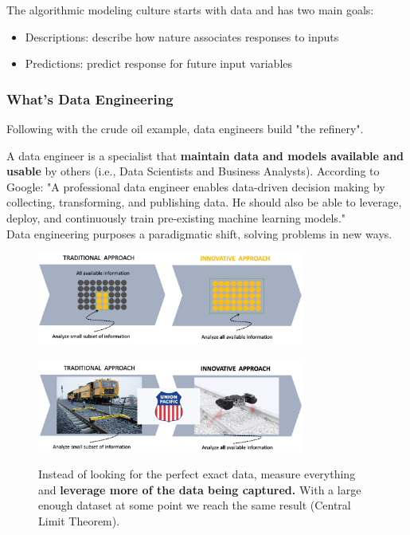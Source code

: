 \documentclass[10pt,a4paper]{article}
\begin{document}
The algorithmic modeling culture starts with data and has two main goals:
\begin{itemize}
	\item Descriptions: describe how nature associates responses to inputs
	\item Predictions: predict response for future input variables
\end{itemize}
\pagebreak
\subsubsection{What's Data Engineering}
Following with the crude oil example, data engineers build "the refinery". 
\\ \vspace{0.5em} \raggedright
A data engineer is a specialist that \textbf{maintain data and models available and usable} by others (i.e., Data Scientists and Business Analysts). According to Google: "A professional data engineer enables data-driven decision making by collecting, transforming, and publishing data. He should also be able to leverage, deploy, and continuously train pre-existing machine learning models." \\ \vspace{0.5em}
Data engineering purposes a paradigmatic shift, solving problems in new ways.
\begin{figure}[h!]
 \hfill \includegraphics[width=250pt]{images/new-1.png}\hspace*{\fill}
  \label{fig:new1}
\end{figure}
\begin{figure}[h!]
 \hfill \includegraphics[width=250pt]{images/new-11.png}\hspace*{\fill}
  \label{fig:new11}
  \caption{Instead of looking for the perfect exact data, measure everything and \textbf{leverage more of the data being captured.} With a large enough dataset at some point we reach the same result (Central Limit Theorem).}
  \end{figure}
\end{document}
